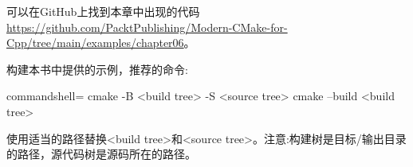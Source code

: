 可以在GitHub上找到本章中出现的代码 \url{https://github.com/PacktPublishing/Modern-CMake-for-Cpp/tree/main/examples/chapter06}。

构建本书中提供的示例，推荐的命令:

\begin{tcblisting}{commandshell={}}
cmake -B <build tree> -S <source tree>
cmake --build <build tree>
\end{tcblisting}

使用适当的路径替换<build tree>和<source tree>。注意:构建树是目标/输出目录的路径，源代码树是源码所在的路径。